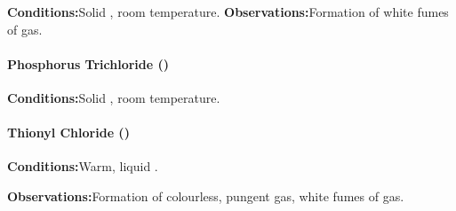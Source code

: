 				\vspace{1.5em}
				\vbox{\textbf{Conditions:}\tabto{35mm}Solid , room temperature.}
				\vbox{\textbf{Observations:}\tabto{35mm}Formation of white fumes of  gas.}





				\paragraph{Phosphorus Trichloride ()}

				\vspace{1.5em}
				\vbox{\textbf{Conditions:}\tabto{35mm}Solid , room temperature.}





				\paragraph{Thionyl Chloride ()}

				\vspace{1.5em}
				\vbox{\textbf{Conditions:}\tabto{35mm}Warm, liquid .}

				\vspace{0.75em}
				\vbox{\textbf{Observations:}\tabto{35mm}Formation of colourless, pungent  gas,
											\tabto{35mm}white fumes of  gas.}

